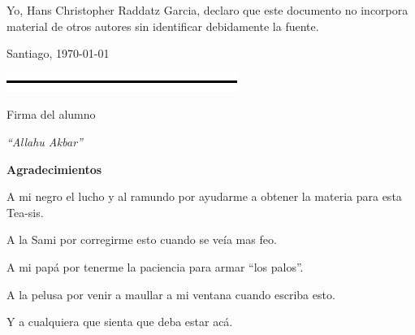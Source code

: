 \documentclass[12pt,a4paper]{article}
\begin{document}
\vspace*{3cm}

Yo, Hans Christopher Raddatz Garcia, declaro que este documento no incorpora material de otros autores sin identificar debidamente la fuente. 

\vspace*{4cm}

\begin{flushright}
Santiago, \monthyeardate\today

\vspace{2cm}

\includegraphics[scale=1]{imagenes/linea.png} 

Firma del alumno

\end{flushright}

\pagebreak		%


\vspace*{20cm}

\begin{flushright}

\textit{``Allahu Akbar''}

\end{flushright}

\pagebreak %



\begin{large}

\textbf{Agradecimientos}



\end{large}

\vspace*{1cm}

A mi negro el lucho y al ramundo por ayudarme a obtener la materia para esta Tea-sis.


A la Sami por corregirme esto cuando se veía mas feo.


A mi papá por tenerme la paciencia para armar ``los palos''.


A la pelusa por venir a maullar a mi ventana cuando escriba esto.


Y a cualquiera que sienta que deba estar acá.

\pagebreak			%
\end{document}
